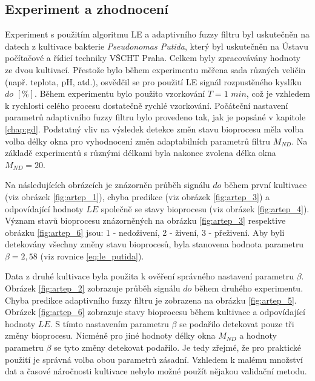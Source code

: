 \documentclass[11pt,twoside,openright]{report}
\begin{document}
\begin{appendices}
\subsection{Experiment a zhodnocení}
Experiment s použitím algoritmu LE a adaptivního fuzzy filtru byl uskutečněn na datech z kultivace bakterie \textit{Pseudonomas Putida}, který byl uskutečněn na Ústavu počítačové a řídicí techniky VŠCHT Praha. Celkem byly zpracovávány hodnoty ze dvou kultivací. Přestože bylo během experimentu měřena sada různých veličin (např. teplota, pH, atd.), osvědčil se pro použití LE signál rozpustěného kyslíku $do$ $[\%]$. Během experimentu bylo použito vzorkování $T=1$ $min$, což je vzhledem k rychlosti celého procesu dostatečně rychlé vzorkování. Počáteční nastavení parametrů adaptivního fuzzy filtru bylo provedeno tak, jak je popsáné v kapitole \ref{chap:gd}. Podstatný vliv na výsledek detekce změn stavu bioprocesu měla volba volba délky okna pro vyhodnocení změn adaptabilních parametrů filtru $M_{ND}$. Na základě experimentů s různými délkami byla nakonec zvolena délka okna $M_{ND}=20$.
\par
Na následujících obrázcích je znázorněn průběh signálu $do$ během první kultivace (viz obrázek \ref{fig:artep_1}), chyba predikce (viz obrázek \ref{fig:artep_3}) a odpovídající hodnoty $LE$ společně se stavy bioprocesu (viz obrázek \ref{fig:artep_4}). Význam stavů bioprocesu znázorněných na obrázku \ref{fig:artep_3} respektive obrázku \ref{fig:artep_6} jsou: 1 - nedoživení, 2 - živení, 3 - přeživení. Aby byli detekovány všechny změny stavu bioprocesů, byla stanovena hodnota parametru $\beta=2,58$ (viz rovnice \ref{eq:le_putida}).
\par
Data z druhé kultivace byla použita k ověření správného nastavení parametru $\beta$.  Obrázek \ref{fig:artep_2} zobrazuje průběh signálu $do$ během druhého experimentu. Chyba predikce adaptivního fuzzy filtru je zobrazena na obrázku \ref{fig:artep_5}.  Obrázek \ref{fig:artep_6} zobrazuje stavy bioprocesu během kultivace a odpovídající hodnoty $LE$. S tímto nastavením parametru $\beta$ se podařilo detekovat pouze tři změny bioprocesu. Nicméně pro jiné hodnoty délky okna $M_{ND}$ a hodnoty parametru $\beta$ se tyto změny detekovat podařilo. Je tedy zřejmé, že pro praktické použití je správná volba obou parametrů zásadní. Vzhledem k malému množství dat a časové náročnosti kultivace nebylo možné použít nějakou validační metodu. 


\end{appendices}
\end{document}
